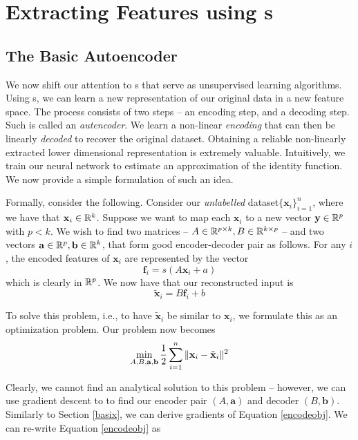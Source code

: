 \section{Extracting Features using \ann{}s}

\subsection{The Basic Autoencoder}

We now shift our attention to \ann{}s that serve as unsupervised learning algorithms. Using \ann{}s, we can learn a new representation of our original data in a new feature space. The process  consists of two steps -- an encoding step, and a decoding step. Such \ann{} is called an \emph{autencoder}. We learn a non-linear \emph{encoding} that can then be linearly \emph{decoded} to recover the original dataset. Obtaining a reliable non-linearly extracted lower dimensional representation is extremely valuable. Intuitively, we train our neural network to estimate an approximation of the identity function. We now provide a simple formulation of such an idea.

Formally, consider the following. Consider our \emph{unlabelled} dataset$\{\mathbf{x}_i\}_{i=1}^n$, where we have that $\mathbf{x}_i\in\mathbb{R}^k$. Suppose we want to map each $\mathbf{x}_i$ to a new vector $\mathbf{y}\in\mathbb{R}^p$ with $p < k$. We wish to find two matrices -- $A\in\mathbb{R}^{p\times k}, B\in\mathbb{R}^{k\times p}$ -- and two vectors  $\mathbf{a}\in\mathbb{R}^p, \mathbf{b}\in\mathbb{R}^k$, that form good encoder-decoder pair as follows. For any $i$, the encoded features of $\mathbf{x}_i$ are represented by the vector 
\begin{equation}
\mathbf{f}_i = s(A\mathbf{x}_i + a)
\end{equation} 
which is clearly in $\mathbb{R}^p$. We now have that our reconstructed input is 
\begin{equation}
\tilde{\mathbf{x}}_i = B\mathbf{f}_i+b
\end{equation}

To solve this problem, i.e., to have $\tilde{\mathbf{x}}_i$ be similar to $\mathbf{x}_i$, we formulate this as an optimization problem. Our problem now becomes
\begin{equation}
\label{encodeobj}
\min_{A, B, \mathbf{a},\mathbf{b}} \frac{1}{2}\sum_{i = 1}^{n} \Vert \mathbf{x}_i - \tilde{\mathbf{x}}_i \Vert ^ 2
\end{equation}

Clearly, we cannot find an analytical solution to this problem -- however, we can use gradient descent to to find our encoder pair $(A,\mathbf{a})$ and decoder $(B, \mathbf{b})$. Similarly to Section \ref{basix}, we can derive gradients of Equation \eqref{encodeobj}. We can re-write Equation \eqref{encodeobj} as 

